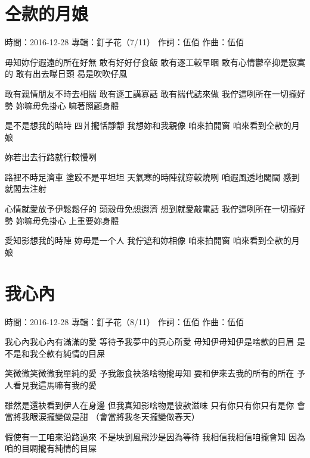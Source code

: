 \documentclass[UTF8,a4paper,oneside,twocolumn,12pt]{ctexbook}
\newcommand{\infopair}[2]{\textbullet #1：#2}
\newcommand{\zc}[1][伍佰]{\infopair{作詞}{#1}}
\newcommand{\zq}[1][伍佰]{\infopair{作曲}{#1}}
\newcommand{\zj}[1]{\infopair{專輯}{#1}}
\newcommand{\sj}[1]{\infopair{時間}{#1}}
\newenvironment{info}{\begin{flushleft}\kaishu
	}
	{\end{flushleft}\normalsize\yahei\par}
\newenvironment{lyric}{
	}
{}
\begin{document}
\section{仝款的月娘}
\begin{info}
	\sj{2016-12-28}
	\zj{釘子花（7/11）}
	\zc
	\zq
\end{info}
\begin{lyric}
	毋知妳佇遐遠的所在好無
	敢有好好仔食飯 敢有逐工較早睏
	敢有心情鬱卒抑是寂寞的
	敢有出去曝日頭 曷是吹吹仔風

	敢有親情朋友不時去相揣
	敢有逐工講寡話 敢有揣代誌來做
	我佇這咧所在一切攏好勢
	妳嘛毋免掛心 嘛著照顧身體

	是不是想我的暗時 四爿攏恬靜靜
	我想妳和我親像
	咱來拍開窗
	咱來看到仝款的月娘

	妳若出去行路就行較慢咧

	路裡不時足濟車 塗跤不是平坦坦
	天氣寒的時陣就穿較燒咧
	咱遐風透地閣闊 感到就閣去注射

	心情就愛放予伊鬆鬆仔的
	頭殼毋免想遐濟 想到就愛敲電話
	我佇這咧所在一切攏好勢
	妳嘛毋免掛心 上重要妳身體

	愛知影想我的時陣 妳毋是一个人
	我佇遮和妳相像
	咱來拍開窗
	咱來看到仝款的月娘
\end{lyric}

\section{我心內}
\begin{info}
	\sj{2016-12-28}
	\zj{釘子花（8/11）}
	\zc
	\zq
\end{info}
\begin{lyric}
	我心內我心內有滿滿的愛
	等待予我夢中的真心所愛
	毋知伊毋知伊是啥款的目眉
	是不是和我仝款有純情的目屎

	笑微微笑微微我單純的愛
	予我飯食袂落啥物攏毋知
	要和伊來去我的所有的所在
	予人看見我這馬嘛有我的愛

	雖然是還袂看到伊人在身邊
	但我真知影啥物是彼款滋味
	只有你只有你只有是你
	會當將我眼涙攏變做是甜
	（會當將我冬天攏變做春天）

	假使有一工咱來沿路過來
	不是坱到風飛沙是因為等待
	我相信我相信咱攏會知
	因為咱的目睭攏有純情的目屎
\end{lyric}
\end{document}
